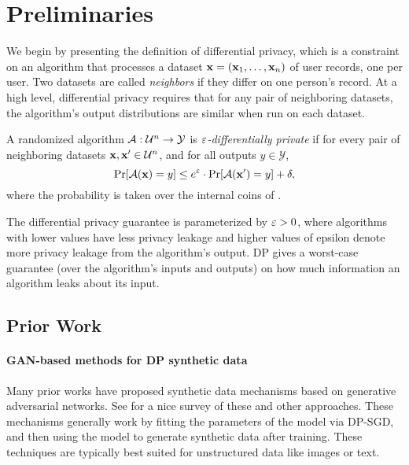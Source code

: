 \section{Preliminaries}
We begin by presenting the definition of differential privacy, which is a constraint on an algorithm \alg that processes a dataset $\mathbf{x} = (\mathbf{x}_1, \ldots, \mathbf{x}_n)$ of user records, one per user. Two datasets are called \emph{neighbors} if they differ on one person's record. At a high level, differential privacy requires that for any pair of neighboring datasets, the algorithm's output distributions are similar when run on each dataset.

\begin{definition}\label{def:DP} A randomized algorithm $\mathcal{A}: \mathcal{U}^{n} \rightarrow \mathcal{Y}$ is {\em $\varepsilon$-differentially private} if for every pair of neighboring datasets $\mathbf{x}, \mathbf{x}'\in \mathcal{U}^n$, and for all outputs $y \in \mathcal{Y}$,
 \begin{equation*}
    \Pr[\mathcal{A}(\mathbf{x}) =y] \leq e^\varepsilon \cdot \Pr[\mathcal{A}(\mathbf{x}') = y] + \delta,
 \end{equation*}
 where the probability is taken over the internal coins of \alg.
 \end{definition}
 
 The differential privacy guarantee is parameterized by $\varepsilon>0$, where algorithms with lower values have less privacy leakage and higher values of epsilon denote more privacy leakage from the algorithm's output. DP gives a worst-case guarantee (over the algorithm's inputs and outputs) on how much information an algorithm leaks about its input.


\subsection{Prior Work}\label{sec:prior_work}

\paragraph{GAN-based methods for DP synthetic data}

Many prior works have proposed synthetic data mechanisms based on generative adversarial networks.  See \cite{yang2024tabular} for a nice survey of these and other approaches.  These mechanisms generally work by fitting the parameters of the model via DP-SGD, and then using the model to generate synthetic data after training.  These techniques are typically best suited for unstructured data like images or text.

